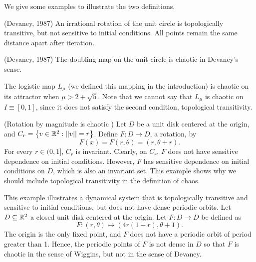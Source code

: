 \documentclass[12pt,draft,twoside]{book}
\begin{document}
We give some examples to illustrate the two definitions.
  \begin{example}
    (Devaney, 1987)
    An irrational rotation of the unit circle is topologically transitive, but not sensitive to initial conditions.
    All points remain the same distance apart after iteration.
  \end{example}
  \begin{example}
    (Devaney, 1987)
    The doubling map on the unit circle is chaotic in Devaney's sense.
  \end{example}
  \begin{example}
    The logistic map $L_\mu$ (we defined this mapping in the introduction) is chaotic on its attractor when $\mu > 2 + \sqrt{5}$.
    Note that we cannot say that $L_\mu$ is chaotic on $I \equiv [0,1]$, since it does not satisfy the second condition, topological transitivity.
  \end{example}
  \begin{example}
    (Rotation by magnitude is chaotic \citep{martelli})
    Let $D$ be a unit disk centered at the origin, and $C_r = \left \{ v \in \mathbb{R}^2: \left|\left| v \right|\right| = r \right \}$.
    Define $F: D \to D$, a rotation, by
    \begin{equation*}
      F(x) = F(r, \theta) = (r, \theta + r).
    \end{equation*}
    For every $r \in (0,1]$, $C_r$ is invariant.
    Clearly, on $C_r$, $F$ does not have sensitive dependence on initial conditions.
    However, $F$ has sensitive dependence on initial conditions on $D$, which is also an invariant set. 
    This example shows why we should include topological transitivity in the definition of chaos.
  \end{example}
  \begin{example}
    \citep{martelli}
    This example illustrates a dynamical system that is topologically transitive and sensitive to initial conditions, but does not have dense periodic orbits.
    Let $D \subseteq \mathbb{R}^2$ a closed unit disk centered at the origin.
    Let $F: D \to D$ be defined as
    \begin{equation*}
      F: (r, \theta) \mapsto (4r(1 - r), \theta + 1).
    \end{equation*}
    The origin is the only fixed point, and $F$ does not have a periodic orbit of period greater than 1.
    Hence, the periodic points of $F$ is not dense in $D$ so that $F$ is chaotic in the sense of Wiggins, but not in the sense of Devaney.
    \label{eg:notdpp}
  \end{example}
\end{document}

